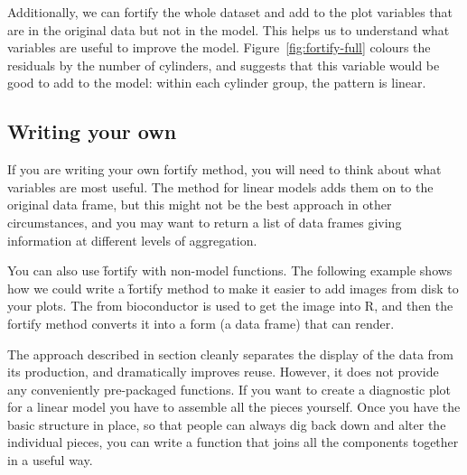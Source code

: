 {Additionally, we can fortify the whole dataset and add to the plot variables that are in the original data but not in the model.  This helps us to understand what variables are useful to improve the model.  Figure~\ref{fig:fortify-full} colours the residuals by the number of cylinders, and suggests that this variable would be good to add to the model: within each cylinder group, the pattern is linear.

% 


\subsection{Writing your own}

If you are writing your own fortify method, you will need to think about what variables are most useful.  The method for linear models adds them on to the original data frame, but this might not be the best approach in other circumstances, and you may want to return a list of data frames giving information at different levels of aggregation.

You can also use \f{fortify} with non-model functions.  The following example shows how we could write a \f{fortify} method to make it easier to add images from disk to your plots.  The  from bioconductor is used to get the image into R, and then the fortify method converts it into a form (a data frame) that \ggplot can render.

% 
% 



The approach described in section cleanly separates the display of the data from its production, and dramatically improves reuse.  However, it does not provide any conveniently pre-packaged functions.  If you want to create a diagnostic plot for a linear model you have to assemble all the pieces yourself.  Once you have the basic structure in place, so that people can always dig back down and alter the individual pieces, you can write a function that joins all the components together in a useful way.

}
